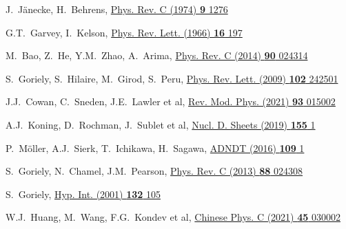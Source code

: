 \renewcommand{\refname}{Список литературы}
\begin{thebibliography}{9}

J.~J{\"a}necke, H.~Behrens,
\href{https://doi.org/10.1103/PhysRevC.9.1276}
  {Phys. Rev. C (1974) \textbf{9} 1276}

G.T.~Garvey, I.~Kelson,
\href{https://doi.org/10.1103/PhysRevLett.16.197}
  {Phys. Rev. Lett. (1966) \textbf{16} 197}

M.~Bao, Z.~He, Y.M.~Zhao, A.~Arima,
\href{https://doi.org/10.1103/PhysRevC.90.024314}
  {Phys. Rev. C (2014) \textbf{90} 024314}

S.~Goriely, S.~Hilaire, M.~Girod, S.~Peru,
\href{https://doi.org/10.1103/PhysRevLett.102.242501}
  {Phys. Rev. Lett. (2009) \textbf{102} 242501}

J.J.~Cowan, C.~Sneden, J.E.~Lawler et al,
\href{https://doi.org/10.1103/RevModPhys.93.015002}{Rev. Mod. Phys. (2021) \textbf{93} 015002}

A.J.~Koning, D.~Rochman, J.~Sublet et al,
\href{https://doi.org/10.1016/j.nds.2019.01.002}
  {Nucl. D. Sheets (2019) \textbf{155} 1}


P.~Möller, A.J.~Sierk, T.~Ichikawa, H.~Sagawa,
\href{https://doi.org/10.1016/j.adt.2015.10.002}
  {ADNDT (2016) \textbf{109} 1}

S.~Goriely, N.~Chamel, J.M.~Pearson,
\href{https://doi.org/10.1103/PhysRevC.82.035804}
  {Phys. Rev. C (2013) \textbf{88} 024308}

S.~Goriely,
\href{http://dx.doi.org/10.1023/A:1011929318210}
  {Hyp. Int. (2001) \textbf{132} 105}

W.J.~Huang, M.~Wang, F.G.~Kondev et al,
\href{https://doi.org/10.1088/1674-1137/abddb0}{Chinese Phys. C (2021) \textbf{45} 030002}


\end{thebibliography}
